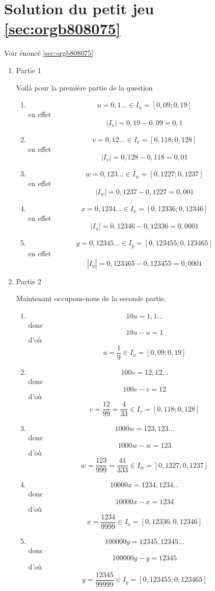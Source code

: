 \documentclass[a4paper, 11pt, twoside]{book}
\begin{document}
\section{Solution du petit jeu \ref{sec:orgb808075}}
\label{sec:org4a65d03}
Voir énoncé \ref{sec:orgb808075}

\begin{enumerate}
\item Partie 1
\label{sec:org6955e76}

Voilà pour la première partie de la question

\begin{enumerate}
\item \[u = 0,1\dots\in I_u = [0,09 ; 0,19]\] en effet \[|I_u| = 0,19 - 0,09 = 0,1\]
\item \[v = 0,12\dots\in I_v = [0,118 ; 0,128]\] en effet \[|I_v| = 0,128 - 0,118 =
      0,01\]
\item \[w = 0,123\dots\in I_w = [0,1227 ; 0,1237]\] en effet \[|I_w| = 0,1237 - 0,1227
      = 0,001\]
\item \[x = 0,1234\dots\in I_x = [0,12336 ; 0,12346]\] en effet \[|I_x| =
      0,12346 - 0,12336 = 0,0001\]
\item \[y = 0,12345\dots\in I_y = [0,123455 ; 0,123465]\] en effet
\[|I_y| = 0,123465 - 0,123455 = 0,0001\]
\end{enumerate}

\item Partie 2
\label{sec:org8c12fbe}

Maintenant occupons-nous de la seconde partie.

\begin{enumerate}
\item \[10u = 1,1\dots\] donc \[10u - u = 1\] d'où \[u = \dfrac{1}{9}\in
      I_u = [0,09 ; 0,19]\]
\item \[100v = 12,12\dots\] donc \[100v - v = 12\] d'où \[v = \dfrac{12}{99}
      = \dfrac{4}{33}\in I_v = [0,118 ; 0,128]\]
\item \[1000w = 123,123\dots\] donc \[1000w - w = 123\] d'où \[w =
      \dfrac{123}{999} = \dfrac{41}{333}\in I_w = [0,1227 ; 0,1237]\]
\item \[10000x = 1234,1234\dots\] donc \[10000x - x = 1234\] d'où \[x =
      \dfrac{1234}{9999}\in I_x = [0,12336 ; 0,12346]\]
\item \[100000y = 12345,12345\dots\] donc \[100000y - y = 12345\] d'où \[y
      = \dfrac{12345}{99999}\in I_y = [0,123455 ; 0,123465]\]
\end{enumerate}
\end{enumerate}
\stopcontents[level-2]
\end{document}
